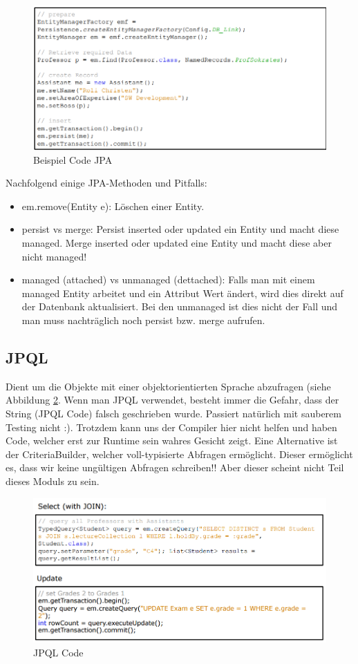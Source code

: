 \begin{figure}[h!]
\centering
\includegraphics[width=0.8\linewidth]{fig/sample-jpa-code}
\caption{Beispiel Code JPA}
\label{fig:sample-jpa-code}
\end{figure}

Nachfolgend einige JPA-Methoden und Pitfalls:
\begin{itemize}
	\item em.remove(Entity e): Löschen einer Entity.
	\item persist vs merge: Persist inserted oder updated ein Entity und macht diese managed. Merge inserted oder updated eine Entity und macht diese aber nicht managed!
	\item managed (attached) vs unmanaged (dettached): Falls man mit einem managed Entity arbeitet und ein Attribut Wert ändert, wird dies direkt auf der Datenbank aktualisiert. Bei den unmanaged ist dies nicht der Fall und man muss nachträglich noch persist bzw. merge aufrufen.
\end{itemize}

\subsection{JPQL}
Dient um die Objekte mit einer objektorientierten Sprache abzufragen (siehe Abbildung \ref{fig:sample-jpql-code}. Wenn man JPQL verwendet, besteht immer die Gefahr, dass der String (JPQL Code) falsch geschrieben wurde. Passiert natürlich mit sauberem Testing nicht :). Trotzdem kann uns der Compiler hier nicht helfen und haben Code, welcher erst zur Runtime sein wahres Gesicht zeigt. Eine Alternative ist der CriteriaBuilder, welcher voll-typisierte Abfragen ermöglicht. Dieser ermöglicht es, dass wir keine ungültigen Abfragen schreiben!! Aber dieser scheint nicht Teil dieses Moduls zu sein.

\begin{figure}[h!]
\centering
\includegraphics[width=0.8\linewidth]{fig/sample-jpql-code}
\caption{JPQL Code}
\label{fig:sample-jpql-code}
\end{figure}

